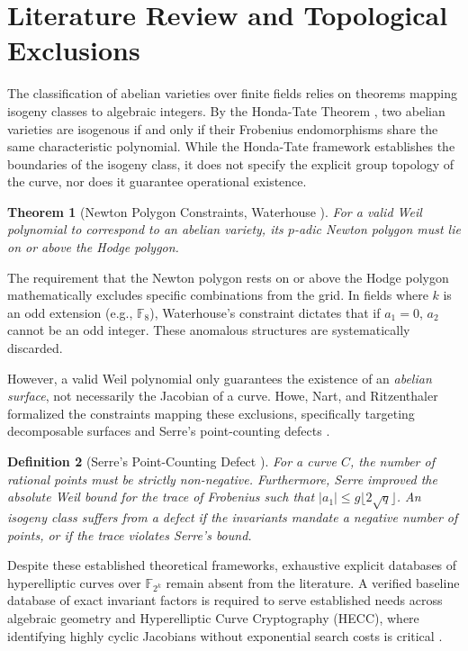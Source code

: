 \documentclass[11pt,letterpaper]{article}
\newtheorem{theorem}{Theorem}[section]
\newtheorem{definition}[theorem]{Definition}
\begin{document}
\section{Literature Review and Topological Exclusions}
The classification of abelian varieties over finite fields relies on theorems mapping isogeny classes to algebraic integers. By the Honda-Tate Theorem \cite{Honda1968, Tate1966}, two abelian varieties are isogenous if and only if their Frobenius endomorphisms share the same characteristic polynomial. While the Honda-Tate framework establishes the boundaries of the isogeny class, it does not specify the explicit group topology of the curve, nor does it guarantee operational existence.

\begin{theorem}[Newton Polygon Constraints, Waterhouse \cite{Waterhouse1969}]
For a valid Weil polynomial to correspond to an abelian variety, its $p$-adic Newton polygon must lie on or above the Hodge polygon.
\end{theorem}

The requirement that the Newton polygon rests on or above the Hodge polygon mathematically excludes specific combinations from the grid. In fields where $k$ is an odd extension (e.g., $\mathbb{F}_8$), Waterhouse's constraint dictates that if $a_1 = 0$, $a_2$ cannot be an odd integer. These anomalous structures are systematically discarded.

However, a valid Weil polynomial only guarantees the existence of an \textit{abelian surface}, not necessarily the Jacobian of a curve. Howe, Nart, and Ritzenthaler formalized the constraints mapping these exclusions, specifically targeting decomposable surfaces and Serre's point-counting defects \cite{Howe2009}. 

\begin{definition}[Serre's Point-Counting Defect \cite{Serre1983}]
For a curve $C$, the number of rational points must be strictly non-negative. Furthermore, Serre improved the absolute Weil bound for the trace of Frobenius such that $|a_1| \le g \lfloor 2\sqrt{q} \rfloor$. An isogeny class suffers from a defect if the invariants mandate a negative number of points, or if the trace violates Serre's bound.
\end{definition}

Despite these established theoretical frameworks, exhaustive explicit databases of hyperelliptic curves over $\mathbb{F}_{2^k}$ remain absent from the literature. A verified baseline database of exact invariant factors is required to serve established needs across algebraic geometry and Hyperelliptic Curve Cryptography (HECC), where identifying highly cyclic Jacobians without exponential search costs is critical \cite{Satoh2008}.
\end{document}
